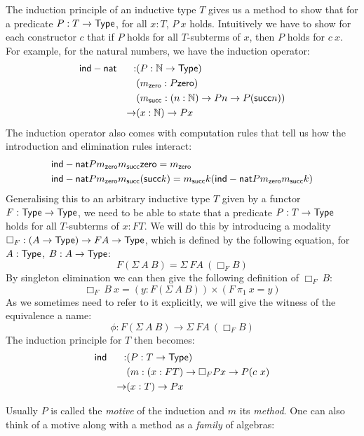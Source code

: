 \documentclass[a4paper,10pt]{article}
\begin{document}
The induction principle of an inductive type $T$ gives us a method to
show that for a predicate $P : T \to \mathsf{Type}$, for all $x : T$, $P\ x$
holds. Intuitively we have to show for each constructor $c$ that if
$P$ holds for all $T$-subterms of $x$, then $P$ holds for $c\ x$. For
example, for the natural numbers, we have the induction operator:
%
\begin{align*}
  &\mathsf{ind-nat} &:   &(P : \mathbb{N} \to \mathsf{Type}) \\
  &        &    &(m_{\mathsf{zero}} : P \mathsf{zero}) \\
  &        &    &(m_{\mathsf{succ}} : (n : \mathbb{N}) \to P n \to P (\mathsf{succ} n)) \\
  &        &\to &(x : \mathbb{N}) \to P x
\end{align*}
%
The induction operator also comes with computation rules that tell us
how the introduction and elimination rules interact:
%
\begin{align*}
  &\mathsf{ind-nat} P m_{\mathsf{zero}} m_{\mathsf{succ}} \mathsf{zero} = m_{\mathsf{zero}} \\
  &\mathsf{ind-nat} P m_{\mathsf{zero}} m_{\mathsf{succ}} (\mathsf{succ} k) = m_{\mathsf{succ}} k (\mathsf{ind-nat} P m_{\mathsf{zero}} m_{\mathsf{succ}} k)
\end{align*}
%
Generalising this to an arbitrary inductive type $T$ given by a
functor $F : \mathsf{Type} \to \mathsf{Type}$, we need to be able to state that a
predicate $P : T \to \mathsf{Type}$ holds for all $T$-subterms of $x : FT$. We
will do this by introducing a modality
$\Box_F : (A \to \mathsf{Type}) \to FA \to \mathsf{Type}$, which is defined by the
following equation, for $A : \mathsf{Type}$, $B : A \to \mathsf{Type}$:
$$
F (\Sigma\ A\ B) = \Sigma\ FA\ (\Box_{F} B)
$$
By singleton elimination we can then give the following definition of $\Box_{F}\ B$:
$$
\Box_{F}\ B\ x = (y : F (\Sigma\ A\ B)) \times (F\ \pi_1\ x = y)
$$
As we sometimes need to refer to it explicitly, we will give the
witness of the equivalence a name:
$$
\phi : F (\Sigma\ A\ B) \to \Sigma\ FA\ (\Box_{F} B)
$$
The induction principle for $T$ then becomes:
%
\begin{align*}
  &\mathsf{ind} &:   &(P : T \to \mathsf{Type}) \\
  &     &    &(m : (x : FT) \to \Box_{F} P x \to P (c\ x) \\
  &     &\to &(x : T) \to P x
\end{align*}
%


Usually $P$ is called the \emph{motive} of the induction and $m$ its
\emph{method}. One can also think of a motive along with a method as a
\emph{family} of algebras:
\end{document}
